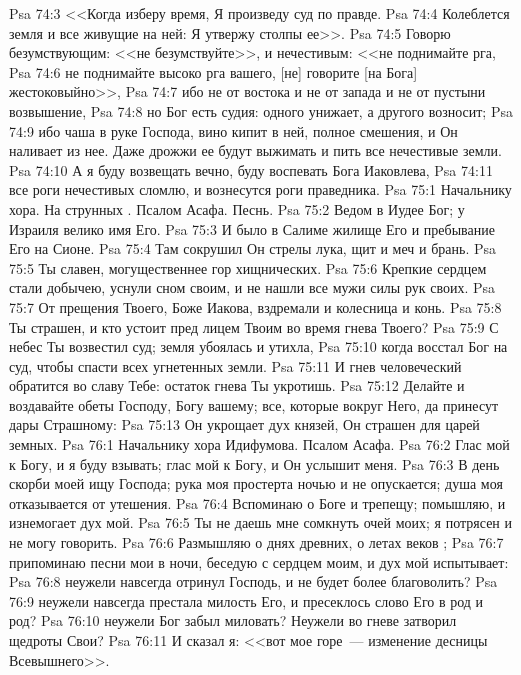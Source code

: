 \vs Psa 74:3 <<Когда изберу время, Я произведу суд по правде.
\vs Psa 74:4 Колеблется земля и все живущие на ней: Я утвержу столпы ее>>.
\vs Psa 74:5 Говорю безумствующим: <<не безумствуйте>>, и нечестивым: <<не поднимайте рга,
\vs Psa 74:6 не поднимайте высоко рга вашего, [не] говорите [на Бога] жестоковыйно>>,
\vs Psa 74:7 ибо не от востока и не от запада и не от пустыни возвышение,
\vs Psa 74:8 но Бог есть судия: одного унижает, а другого возносит;
\vs Psa 74:9 ибо чаша в руке Господа, вино кипит в ней, полное смешения, и Он наливает из нее. Даже дрожжи ее будут выжимать и пить все нечестивые земли.
\vs Psa 74:10 А я буду возвещать вечно, буду воспевать Бога Иаковлева,
\vs Psa 74:11 все роги нечестивых сломлю, и вознесутся роги праведника.
\vs Psa 75:1 Начальнику хора. На струнных . Псалом Асафа. Песнь.
\rsbpar\vs Psa 75:2 Ведом в Иудее Бог; у Израиля велико имя Его.
\vs Psa 75:3 И было в Салиме жилище Его и пребывание Его на Сионе.
\vs Psa 75:4 Там сокрушил Он стрелы лука, щит и меч и брань.
\vs Psa 75:5 Ты славен, могущественнее гор хищнических.
\vs Psa 75:6 Крепкие сердцем стали добычею, уснули сном своим, и не нашли все мужи силы рук своих.
\vs Psa 75:7 От прещения Твоего, Боже Иакова, вздремали и колесница и конь.
\vs Psa 75:8 Ты страшен, и кто устоит пред лицем Твоим во время гнева Твоего?
\vs Psa 75:9 С небес Ты возвестил суд; земля убоялась и утихла,
\vs Psa 75:10 когда восстал Бог на суд, чтобы спасти всех угнетенных земли.
\vs Psa 75:11 И гнев человеческий обратится во славу Тебе: остаток гнева Ты укротишь.
\vs Psa 75:12 Делайте и воздавайте обеты Господу, Богу вашему; все, которые вокруг Него, да принесут дары Страшному:
\vs Psa 75:13 Он укрощает дух князей, Он страшен для царей земных.
\vs Psa 76:1 Начальнику хора Идифумова. Псалом Асафа.
\rsbpar\vs Psa 76:2 Глас мой к Богу, и я буду взывать; глас мой к Богу, и Он услышит меня.
\vs Psa 76:3 В день скорби моей ищу Господа; рука моя простерта ночью и не опускается; душа моя отказывается от утешения.
\vs Psa 76:4 Вспоминаю о Боге и трепещу; помышляю, и изнемогает дух мой.
\vs Psa 76:5 Ты не даешь мне сомкнуть очей моих; я потрясен и не могу говорить.
\vs Psa 76:6 Размышляю о днях древних, о летах веков ;
\vs Psa 76:7 припоминаю песни мои в ночи, беседую с сердцем моим, и дух мой испытывает:
\vs Psa 76:8 неужели навсегда отринул Господь, и не будет более благоволить?
\vs Psa 76:9 неужели навсегда престала милость Его, и пресеклось слово Его в род и род?
\vs Psa 76:10 неужели Бог забыл миловать? Неужели во гневе затворил щедроты Свои?
\vs Psa 76:11 И сказал я: <<вот мое горе~--- изменение десницы Всевышнего>>.
